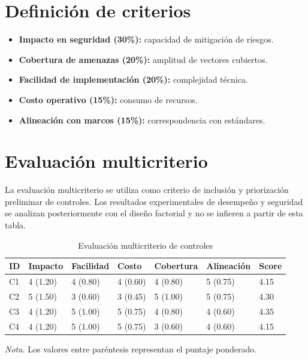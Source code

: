 \section{Definición de criterios}

\begin{itemize}[noitemsep]
    \item \textbf{Impacto en seguridad (30\%):} capacidad de mitigación de riesgos.
    \item \textbf{Cobertura de amenazas (20\%):} amplitud de vectores cubiertos.
    \item \textbf{Facilidad de implementación (20\%):} complejidad técnica.
    \item \textbf{Costo operativo (15\%):} consumo de recursos.
    \item \textbf{Alineación con marcos (15\%):} correspondencia con estándares.
\end{itemize}

\section{Evaluación multicriterio}

La evaluación multicriterio se utiliza como criterio de inclusión y priorización preliminar de controles. Los resultados experimentales de desempeño y seguridad se analizan posteriormente con el diseño factorial y no se infieren a partir de esta tabla.

\begin{table}[htbp]
\centering
\caption{Evaluación multicriterio de controles}
\label{tab:ranking_controles}
\renewcommand{\arraystretch}{1.3}

\begin{tabular}{p{1cm} p{2cm} p{2cm} p{2cm} p{2cm} p{2cm} p{2cm}}
\hline
\textbf{ID} & \textbf{Impacto} & \textbf{Facilidad} & \textbf{Costo} & \textbf{Cobertura} & \textbf{Alineación} & \textbf{Score} \\
\hline

C1 & 4 (1.20) & 4 (0.80) & 4 (0.60) & 4 (0.80) & 5 (0.75) & 4.15 \\

C2 & 5 (1.50) & 3 (0.60) & 3 (0.45) & 5 (1.00) & 5 (0.75) & 4.30 \\

C3 & 4 (1.20) & 5 (1.00) & 5 (0.75) & 4 (0.80) & 4 (0.60) & 4.35 \\

C4 & 4 (1.20) & 5 (1.00) & 5 (0.75) & 3 (0.60) & 4 (0.60) & 4.15 \\

\hline
\end{tabular}

\vspace{0.2cm}
{\raggedright \small \textit{Nota.} Los valores entre paréntesis representan el puntaje ponderado.\par}

\end{table}

